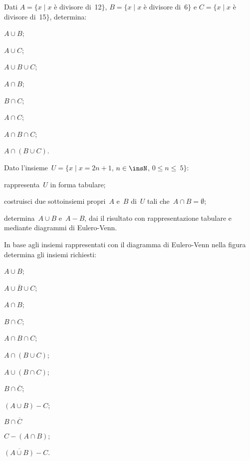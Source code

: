 \begin{esercizio}
\label{ese:\thechapter.134}
Dati $A=\{x\mid x$ è divisore di~12$\}$, $B=\{x\mid x$ è divisore di~6$\}$ e
$C=\{x\mid x$ è divisore di~15$\}$, determina:
\begin{multicols}{4}
 \begin{enumeratea}
 \item $A\cup B$;
 \item $A\cup C$;
 \item $A\cup B\cup C$;
 \item $A\cap B$;
 \item $B\cap C$;
 \item $A\cap C$;
 \item $A\cap B\cap C$;
 \item $A\cap(B\cup C)$.
 \end{enumeratea}
\end{multicols}
\end{esercizio}

\begin{esercizio}
\label{ese:\thechapter.135}
Dato l'insieme~$U=\{x\mid x=2n+1$, $n\in\insN$, $0\le n\le~5\}$:

\begin{enumeratea}
\item rappresenta~$U$ in forma tabulare;
\item costruisci due sottoinsiemi propri~$A$ e~$B$ di~$U$ tali che~$A\cap B=\emptyset $;
\item determina~$A\cup B$ e~$A-B$, dai il risultato con rappresentazione tabulare e mediante diagrammi di
Eulero-Venn.
\end{enumeratea}
\end{esercizio}

\begin{esercizio}
\label{ese:\thechapter.136}
In base agli insiemi rappresentati con il diagramma di Eulero-Venn nella figura determina gli insiemi richiesti:
\begin{multicols}{2}
\begin{enumeratea}
\item $A\cup B$;
\item $\overline{A\cup B\cup C}$;
\item $A\cap B$;
\item $B\cap C$;
\item $A\cap B\cap C$;
\item $A\cap (B\cup C)$;
\item $A\cup (B\cap C)$;
\item $B\cap \overline{C}$;
\item $(A\cup B)-C$;
\item $B\cap \overline{C}$
\item $C-(A\cap B)$;
\item $\overline{(A\cup B)}-C$.
\end{enumeratea}
\begin{center}
 
\end{center}
\end{multicols}
\end{esercizio}

